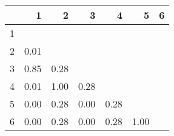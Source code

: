 \begin{tabular}{r|rrrrrr}
  & 1 & 2 & 3 & 4 & 5 & 6 \\ 
  \hline
1 &  &  &  &  &  &  \\ 
  2 & 0.01 &  &  &  &  &  \\ 
  3 & 0.85 & 0.28 &  &  &  &  \\ 
  4 & 0.01 & 1.00 & 0.28 &  &  &  \\ 
  5 & 0.00 & 0.28 & 0.00 & 0.28 &  &  \\ 
  6 & 0.00 & 0.28 & 0.00 & 0.28 & 1.00 &  \\ 
   \hline
\end{tabular}
